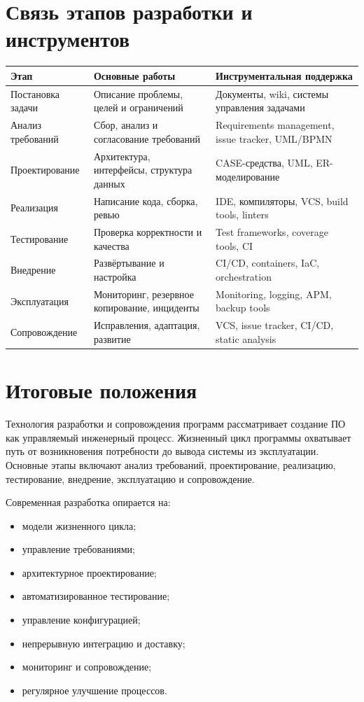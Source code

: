 \documentclass[12pt,a4paper]{article}
\begin{document}
\section{Связь этапов разработки и инструментов}

\begin{longtable}{|p{4cm}|p{6cm}|p{5cm}|}
\hline
\textbf{Этап} & \textbf{Основные работы} & \textbf{Инструментальная поддержка} \\
\hline
Постановка задачи &
Описание проблемы, целей и ограничений &
Документы, wiki, системы управления задачами \\
\hline
Анализ требований &
Сбор, анализ и согласование требований &
Requirements management, issue tracker, UML/BPMN \\
\hline
Проектирование &
Архитектура, интерфейсы, структура данных &
CASE-средства, UML, ER-моделирование \\
\hline
Реализация &
Написание кода, сборка, ревью &
IDE, компиляторы, VCS, build tools, linters \\
\hline
Тестирование &
Проверка корректности и качества &
Test frameworks, coverage tools, CI \\
\hline
Внедрение &
Развёртывание и настройка &
CI/CD, containers, IaC, orchestration \\
\hline
Эксплуатация &
Мониторинг, резервное копирование, инциденты &
Monitoring, logging, APM, backup tools \\
\hline
Сопровождение &
Исправления, адаптация, развитие &
VCS, issue tracker, CI/CD, static analysis \\
\hline
\end{longtable}

\section{Итоговые положения}

Технология разработки и сопровождения программ рассматривает создание ПО как управляемый инженерный процесс. Жизненный цикл программы охватывает путь от возникновения потребности до вывода системы из эксплуатации. Основные этапы включают анализ требований, проектирование, реализацию, тестирование, внедрение, эксплуатацию и сопровождение.

Современная разработка опирается на:
\begin{itemize}
    \item модели жизненного цикла;
    \item управление требованиями;
    \item архитектурное проектирование;
    \item автоматизированное тестирование;
    \item управление конфигурацией;
    \item непрерывную интеграцию и доставку;
    \item мониторинг и сопровождение;
    \item регулярное улучшение процессов.
\end{itemize}
\end{document}
